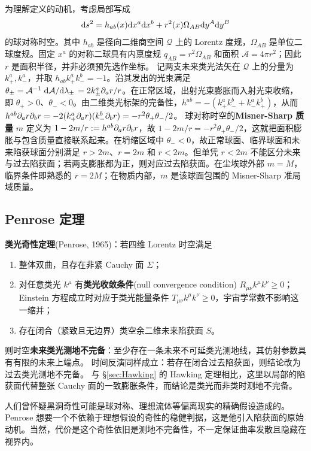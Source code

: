 为理解定义的动机，考虑局部写成
\[\dd s^2=h_{ab}(x)\dd x^a\dd x^b+r^2(x)\Omega_{AB}\dd y^A\dd y^B\]
的球对称时空。其中 $h_{ab}$ 是径向二维商空间 $\mathcal Q$ 上的 Lorentz 度规，$\Omega_{AB}$ 是单位二球度规。固定 $x^a$ 的对称二球具有内禀度规 $q_{AB}=r^2\Omega_{AB}$ 和面积 $\mathcal A=4\pi r^2$；因此 $r$ 是面积半径，并非必须预先选作坐标。
记两支未来类光法矢在 $\mathcal Q$ 上的分量为 $k_+^a,k_-^a$，并取 $h_{ab}k_+^ak_-^b=-1$。沿其发出的光束满足 $\theta_\pm=\mathcal A^{-1}\dv*{\mathcal A}{\lambda_\pm}=2k_\pm^a\partial_ar/r$。在正常区域，出射光束膨胀而入射光束收缩，即 $\theta_+>0$、$\theta_-<0$。由二维类光标架的完备性，$h^{ab}=-(k_+^ak_-^b+k_-^ak_+^b)$，从而 $h^{ab}\partial_ar\partial_br=-2(k_+^a\partial_ar)(k_-^b\partial_br)=-r^2\theta_+\theta_-/2$。
球对称时空的\textbf{Misner-Sharp 质量} $m$ 定义为 $1-2m/r:=h^{ab}\partial_ar\partial_br$，故 $1-2m/r=-r^2\theta_+\theta_-/2$，这就把面积膨胀与包含质量直接联系起来。在坍缩区域中 $\theta_-<0$，故正常球面、临界球面和未来陷获球面分别满足 $r>2m$、$r=2m$ 和 $r<2m$。但单凭 $r<2m$ 不能区分未来与过去陷获面；若两支膨胀都为正，则对应过去陷获面。在尘埃球外部 $m=M$，临界条件即熟悉的 $r=2M$；在物质内部，$m$ 是该球面包围的 Misner-Sharp 准局域质量。


\subsection{Penrose 定理}

\noindent \textbf{类光奇性定理}(Penrose, 1965)：若四维 Lorentz 时空满足
\begin{enumerate}
    \item 整体双曲，且存在非紧 Cauchy 面 $\Sigma$；
    \item 对任意类光 $k^\mu$ 有\textbf{类光收敛条件}(null convergence condition) $R_{\mu\nu}k^\mu k^\nu\geqslant0$；Einstein 方程成立时对应于类光能量条件 $T_{\mu\nu}k^\mu k^\nu\geqslant0$，宇宙学常数不影响这一缩并；
    \item 存在闭合（紧致且无边界）类空余二维未来陷获面 $S$。
\end{enumerate}
则时空\textbf{未来类光测地不完备}：至少存在一条未来不可延类光测地线，其仿射参数具有有限的未来上端点。
时间反演同样成立：若存在闭合过去陷获面，则结论改为过去类光测地不完备。
与 \S\ref{sec:Hawking} 的 Hawking 定理相比，这里以局部的陷获面代替整张 Cauchy 面的一致膨胀条件，而结论是类光而非类时测地不完备。

人们曾怀疑黑洞奇性可能是球对称、理想流体等偏离现实的精确假设造成的。Penrose 想要一个不依赖于理想假设的奇性的稳健判据，这是他引入陷获面的原始动机。当然，代价是这个奇性依旧是测地不完备性，不一定保证曲率发散且隐藏在视界内。


